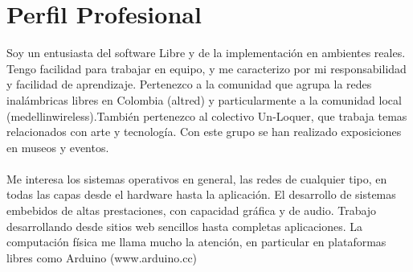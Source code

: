 \documentclass[a4paper, oneside, final, letter]{scrartcl}
\begin{document}
\section{Perfil Profesional}
Soy un entusiasta del software Libre y de la implementaci\'on en ambientes reales. Tengo facilidad para trabajar en equipo, y me caracterizo por mi responsabilidad y facilidad de aprendizaje. Pertenezco a la comunidad que agrupa la redes inal\'ambricas libres en Colombia (altred) y particularmente a la comunidad local (medellinwireless).Tambi\'en pertenezco al colectivo Un-Loquer, que trabaja temas relacionados con arte y tecnolog\'ia.
Con este grupo se han realizado exposiciones en museos y eventos.\\
\\
Me interesa los sistemas operativos en general, las redes de cualquier tipo, en todas las capas desde el hardware hasta la aplicaci\'on. El desarrollo de sistemas embebidos de altas prestaciones, con capacidad gr\'afica y de audio. Trabajo desarrollando desde sitios web sencillos hasta completas aplicaciones.
La computaci\'on f\'isica me llama mucho la atenci\'on, en particular en plataformas libres como Arduino (www.arduino.cc)
\end{document}
